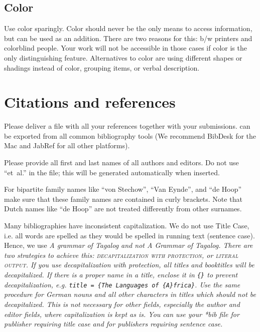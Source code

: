 {\subsection{Color}
Use color sparingly. Color should never be the only means to access information, but can be used as an addition. There are two reasons for this: b/w printers and colorblind people. Your work will not be accessible in those cases if color is the only distinguishing feature. Alternatives to color are using different shapes or shadings instead of color, grouping items, or verbal description. 




\section{Citations and references}
\label{sec-references-authors}

Please deliver a \BibTeX\xspace file with all your references together with your submissions. 
\BibTeX\xspace can be exported from all common bibliography tools (We recommend BibDesk for the Mac and JabRef for all other platforms). 

Please provide all first and last names of all authors and editors. Do not use ``et~al.''  in the \BibTeX\xspace file; this will be generated automatically when inserted.

For bipartite family names like ``von Stechow'', ``Van Eynde'', and ``de Hoop'' make sure that these
family names are contained in curly brackets.
 Note that Dutch names like ``de Hoop'' are not treated differently from other surnames.

Many bibliographies have inconsistent capitalization. We do not use Title Case, i.e. all words are spelled as they would be spelled in running text (sentence case). Hence, we use \em A grammar of Tagalog \em and not \em A Grammar of Tagalog\em. There are two strategies to achieve this: \textsc{decapitalization with protection}, or \textsc{literal output}. If you use decapitalization with protection, all titles and booktitles will be decapitalized.  If there is a proper name in a title, enclose it in \verb+{}+ to prevent decapitalization, e.g. \verb+title = {The Languages of {A}frica}+. Use the same procedure for German nouns and all other characters in titles which should not be decapitalized. This is not necessary for other fields, especially the author and editor fields, where capitalization is kept as is. You can use your *bib file for publisher requiring title case and for publishers requiring sentence case.

}
